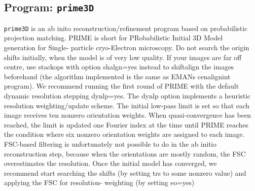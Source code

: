 \documentclass[a4paper,11pt]{article}
\newcommand{\prgname}[1]{\textcolor{NavyBlue}{\texttt{#1}}}
\begin{document}
\subsection{Program: \prgname{prime3D}}
\label{prime3D}
\prgname{prime3D} is an ab inito reconstruction/refinement program based on probabilistic projection matching. PRIME is short for PRobabilistic Initial 3D Model generation for Single- particle cryo-Electron microscopy. Do not search the origin shifts initially, when the model is of very low quality. If your images are far off centre, use stackops with option shalgn=yes instead to shiftalign the images beforehand (the algorithm implemented is the same as EMANs cenalignint program). We recommend running the first round of PRIME with the default dynamic resolution stepping dynlp=yes. The dynlp option implements a heuristic resolution weighting/update scheme. The initial low-pass limit is set so that each image receives ten nonzero orientation weights. When quasi-convergence has been reached, the limit is updated one Fourier index at the time until PRIME reaches the condition where six nonzero orientation weights are assigned to each image. FSC-based filtering is unfortunately not possible to do in the ab initio reconstruction step, because when the orientations are mostly random, the FSC overestimates the resolution. Once the initial model has converged, we recommend start searching the shifts (by setting trs to some nonzero value) and applying the FSC for resolution- weighting (by setting eo=yes)
\end{document}
